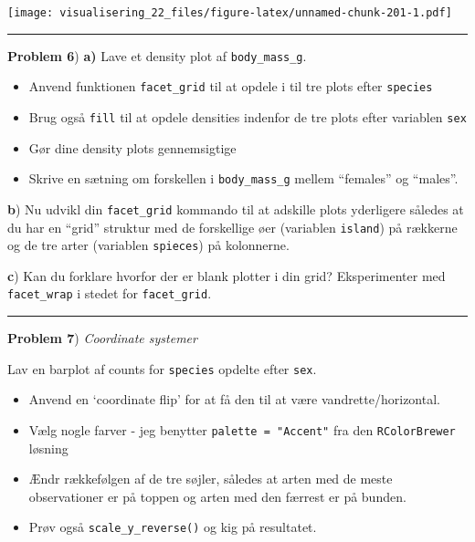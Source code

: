 \documentclass[
]{book}
\providecommand{\tightlist}{%
  \setlength{\itemsep}{0pt}\setlength{\parskip}{0pt}}
\begin{document}
\texttt{[image: visualisering\_22\_files/figure-latex/unnamed-chunk-201-1.pdf]}

\begin{center}\rule{0.5\linewidth}{0.5pt}\end{center}

\textbf{Problem 6}) \textbf{a)} Lave et density plot af \texttt{body\_mass\_g}.

\begin{itemize}
\tightlist
\item
  Anvend funktionen \texttt{facet\_grid} til at opdele i til tre plots efter \texttt{species}
\item
  Brug også \texttt{fill} til at opdele densities indenfor de tre plots efter variablen \texttt{sex}
\item
  Gør dine density plots gennemsigtige
\item
  Skrive en sætning om forskellen i \texttt{body\_mass\_g} mellem ``females'' og ``males''.
\end{itemize}

\textbf{b}) Nu udvikl din \texttt{facet\_grid} kommando til at adskille plots yderligere således at du har en ``grid'' struktur med de forskellige øer (variablen \texttt{island}) på rækkerne og de tre arter (variablen \texttt{spieces}) på kolonnerne.

\textbf{c}) Kan du forklare hvorfor der er blank plotter i din grid? Eksperimenter med \texttt{facet\_wrap} i stedet for \texttt{facet\_grid}.

\begin{center}\rule{0.5\linewidth}{0.5pt}\end{center}

\textbf{Problem 7}) \emph{Coordinate systemer}

Lav en barplot af counts for \texttt{species} opdelte efter \texttt{sex}.

\begin{itemize}
\item
  Anvend en `coordinate flip' for at få den til at være vandrette/horizontal.
\item
  Vælg nogle farver - jeg benytter \texttt{palette\ =\ "Accent"} fra den \texttt{RColorBrewer} løsning
\item
  Ændr rækkefølgen af de tre søjler, således at arten med de meste observationer er på toppen og arten med den færrest er på bunden.
\item
  Prøv også \texttt{scale\_y\_reverse()} og kig på resultatet.
\end{itemize}
\end{document}
